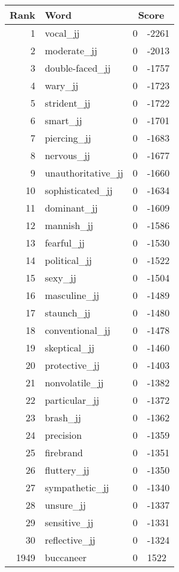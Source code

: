 \begin{longtable}[!htbp]{| rlr@{.}l |}
    \hline
    \textbf{Rank} & \textbf{Word} & \multicolumn{2}{c|}{\textbf{Score}} \\
    \hline
    \endhead
    1 & vocal\_jj & 0 & -2261 \\
    2 & moderate\_jj & 0 & -2013 \\
    3 & double-faced\_jj & 0 & -1757 \\
    4 & wary\_jj & 0 & -1723 \\
    5 & strident\_jj & 0 & -1722 \\
    6 & smart\_jj & 0 & -1701 \\
    7 & piercing\_jj & 0 & -1683 \\
    8 & nervous\_jj & 0 & -1677 \\
    9 & unauthoritative\_jj & 0 & -1660 \\
    10 & sophisticated\_jj & 0 & -1634 \\
    11 & dominant\_jj & 0 & -1609 \\
    12 & mannish\_jj & 0 & -1586 \\
    13 & fearful\_jj & 0 & -1530 \\
    14 & political\_jj & 0 & -1522 \\
    15 & sexy\_jj & 0 & -1504 \\
    16 & masculine\_jj & 0 & -1489 \\
    17 & staunch\_jj & 0 & -1480 \\
    18 & conventional\_jj & 0 & -1478 \\
    19 & skeptical\_jj & 0 & -1460 \\
    20 & protective\_jj & 0 & -1403 \\
    21 & nonvolatile\_jj & 0 & -1382 \\
    22 & particular\_jj & 0 & -1372 \\
    23 & brash\_jj & 0 & -1362 \\
    24 & precision & 0 & -1359 \\
    25 & firebrand & 0 & -1351 \\
    26 & fluttery\_jj & 0 & -1350 \\
    27 & sympathetic\_jj & 0 & -1340 \\
    28 & unsure\_jj & 0 & -1337 \\
    29 & sensitive\_jj & 0 & -1331 \\
    30 & reflective\_jj & 0 & -1324 \\
    1949 & buccaneer & 0 & 1522 \\

\end{longtable}
